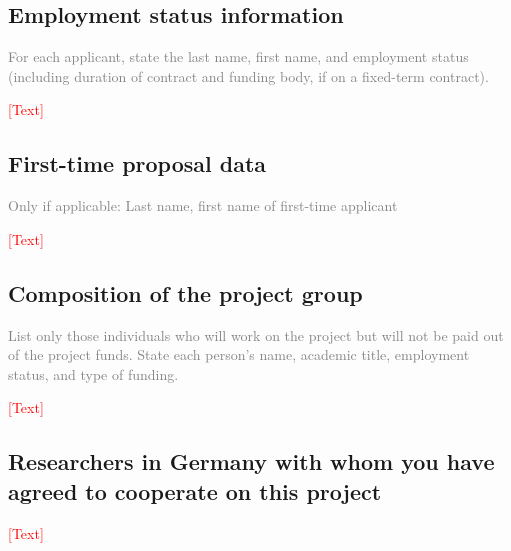\documentclass[a4paper,11pt]{article}
\begin{document}





\subsection{Employment status information}
\textcolor{gray}{For each applicant, state the last name, first name, and employment status (including duration of contract and funding body, if on a fixed-term contract).}

\noindent\textcolor{red}{[Text]}

\subsection{First-time proposal data}
\textcolor{gray}{Only if applicable: Last name, first name of first-time applicant}

\noindent\textcolor{red}{[Text]}

\subsection{Composition of the project group}
\textcolor{gray}{List only those individuals who will work on the project but will not be paid out of the project funds. State each person’s name, academic title, employment status, and type of funding.}

\noindent\textcolor{red}{[Text]}

\subsection{Researchers in Germany with whom you have agreed to cooperate on this project}

\noindent\textcolor{red}{[Text]}
\end{document}
